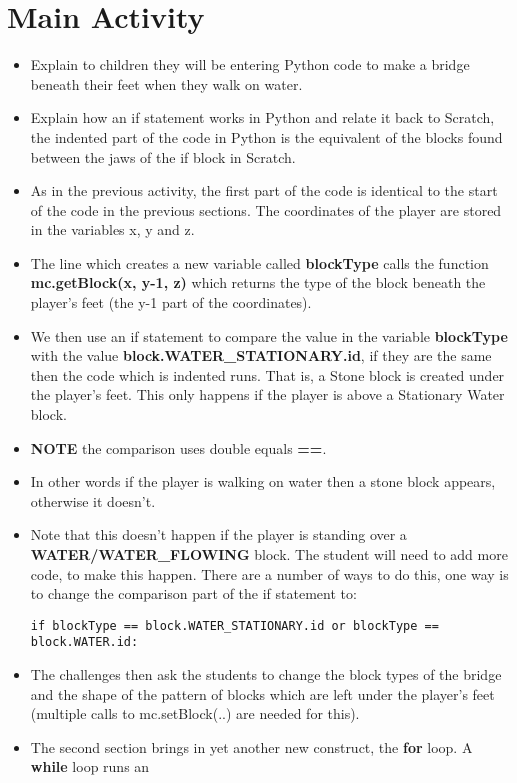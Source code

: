 \documentclass{geocraft-lesson-plan}
\begin{document}
\section*{Main Activity}
\begin{itemize}
\item Explain to children they will be entering Python code to make a bridge beneath their feet when they walk on water. 
\item Explain how an if statement works in Python and relate it back to Scratch, the indented part of the code in Python
  is the equivalent of the blocks found between the jaws of the if block in Scratch. 
\item As in the previous activity, the first part of the code is identical to the start of the code in the previous
  sections. The coordinates of the player are stored in the variables x, y and z.
\item The line which creates a new variable called \textbf{blockType} calls the function \textbf{mc.getBlock(x, y-1, z)}
  which returns the type of the block beneath the player's feet (the y-1 part of the coordinates).  
\item We then use an if statement to compare the value in the variable \textbf{blockType} with the value
  \textbf{block.WATER\_STATIONARY.id}, if they are the same then the code which is indented runs. That is, a Stone block
  is created under the player's feet. This only happens if the player is above a Stationary Water block.
\item \textbf{NOTE} the comparison uses double equals \textbf{==}. 
\item In other words if the player is walking on water then a stone block appears, otherwise it doesn't.
\item Note that this doesn't happen if the player is standing over a \textbf{WATER/WATER\_FLOWING} block. The student
  will need to add more code, to make this happen. There are a number of ways to do this, one way is to change the
  comparison part of the if statement to: 
\begin{verbatim}if blockType == block.WATER_STATIONARY.id or blockType == block.WATER.id:\end{verbatim} 
\item The challenges then ask the students to change the block types of the bridge and the shape of the pattern of
  blocks which are left under the player's feet (multiple calls to mc.setBlock(..) are needed for this).
\item The second section brings in yet another new construct, the \textbf{for} loop. A \textbf{while} loop runs an

\end{itemize}
\end{document}
